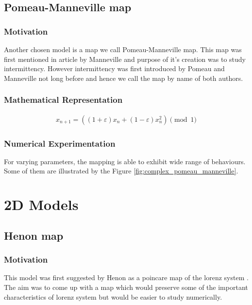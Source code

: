 \subsection{Pomeau-Manneville map}

\subsubsection{Motivation}
Another chosen model is a map we call Pomeau-Manneville map.
This map was first mentioned in article by Manneville \cite{Manneville1980} and purpose of it's creation was to study intermittency.
However intermittency was first introduced by Pomeau and Manneville \cite{Pomeau1980} not long before \cite{Manneville1980} and hence we call the map by name of both authors.

\subsubsection{Mathematical Representation}

\begin{align}
    x_{n+1} = ((1 + \varepsilon) x_{n} + (1 - \varepsilon) x_{n}^2) \pmod{1}
\end{align}

\subsubsection{Numerical Experimentation}
For varying parameters, the mapping is able to exhibit wide range of behaviours.
Some of them are illustrated by the Figure \ref{fig:complex_pomeau_manneville}.

\section{2D Models}

\subsection{Henon map}

\subsubsection{Motivation}

This model was first suggested by Henon \cite{Henon1976} as a poincare map of the lorenz system \cite{Lorenz2004}.
The aim was to come up with a map which would preserve some of the important characteristics of lorenz system but would be easier to study numerically.


